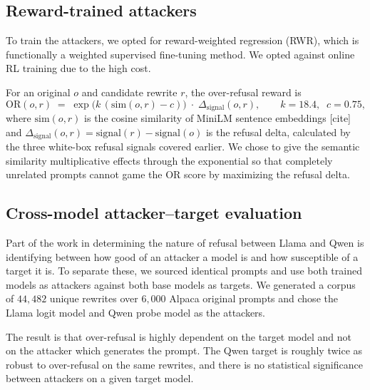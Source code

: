 \documentclass{article}
\begin{document}
\subsection{Reward-trained attackers}

To train the attackers, we opted for reward-weighted regression (RWR), which is functionally a weighted supervised fine-tuning method. We opted against online RL training due to the high cost.

For an original $o$ and candidate rewrite $r$, the over-refusal reward is \begin{equation}\mathrm{OR}(o,r) \;=\; \exp\!\big(k\,(\mathrm{sim}(o,r) - c)\big)\;\cdot\;\Delta_{\mathrm{signal}}(o,r),\qquad k = 18.4,\;\; c = 0.75,\label{eq:or-reward}\end{equation}where $\mathrm{sim}(o,r)$ is the cosine similarity of MiniLM sentence embeddings [cite] and $\Delta_{\mathrm{signal}}(o,r) = \mathrm{signal}(r) - \mathrm{signal}(o)$ is the refusal delta, calculated by the three white-box refusal signals covered earlier. We chose to give the semantic similarity multiplicative effects through the exponential so that completely unrelated prompts cannot game the OR score by maximizing the refusal delta.

\subsection{Cross-model attacker--target evaluation}
Part of the work in determining the nature of refusal between Llama and Qwen is identifying between how good of an attacker a model is and how susceptible of a target it is. To separate these, we sourced identical prompts and use both trained models as attackers against both base models as targets. We generated a corpus of $44{,}482$ unique rewrites over $6{,}000$ Alpaca original prompts and chose the Llama logit model and Qwen probe model as the attackers. 

The result is that over-refusal is highly dependent on the target model and not on the attacker which generates the prompt. The Qwen target is roughly twice as  robust to over-refusal on the same rewrites, and there is no statistical significance between attackers on a given target model. 
\end{document}
